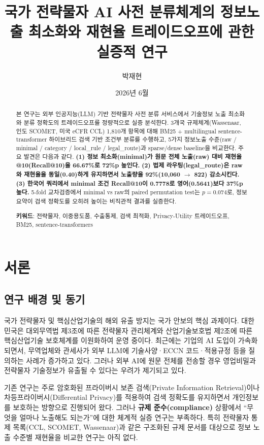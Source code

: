 \documentclass[11pt,a4paper]{article}
\title{\textbf{국가 전략물자 AI 사전 분류체계의 정보노출 최소화와 재현율 트레이드오프에 관한 실증적 연구}}
\author{박재현}
\date{2026년 6월}
\begin{document}
\maketitle

\begin{abstract}
본 연구는 외부 인공지능(LLM) 기반 전략물자 사전 분류 서비스에서 기술정보 노출 최소화와 분류 정확도의 트레이드오프를 정량적으로 실증 분석한다. 3개국 규제체계(Wassenaar, 인도 SCOMET, 미국 eCFR CCL) 1,810개 항목에 대해 BM25 + multilingual sentence-transformer 하이브리드 검색 기반 조건부 분류를 수행하고, 5가지 정보노출 수준(raw / minimal / category / local\_rule / legal\_route)과 sparse/dense baseline을 비교한다. 주요 발견은 다음과 같다. \textbf{(1) 정보 최소화(minimal)가 원문 전체 노출(raw) 대비 재현율@10(Recall@10)을 66.67\%로 72\%p 높인다.} \textbf{(2) 법제 라우팅(legal\_route)은 raw와 재현율을 동일(0.40)하게 유지하면서 노출량을 92\%(10,060 $\to$ 822) 감소시킨다.} \textbf{(3) 한국어 쿼리에서 minimal 조건 Recall@10이 0.7778로 영어(0.5641)보다 37\%p 높다.} 5-fold 교차검증에서 minimal vs raw의 paired permutation test는 $p=0.074$로, 정보 요약이 검색 정확도를 오히려 높이는 비직관적 결과를 실증한다.

\vspace{0.5cm}
\noindent\textbf{키워드}: 전략물자, 이중용도품, 수출통제, 검색 최적화, Privacy-Utility 트레이드오프, BM25, sentence-transformers
\end{abstract}

\section{서론}
\label{sec:intro}

\subsection{연구 배경 및 동기}
국가 전략물자 및 핵심산업기술의 해외 유출 방지는 국가 안보의 핵심 과제이다. 대한민국은 대외무역법 제3조에 따른 전략물자 관리체계와 산업기술보호법 제2조에 따른 핵심산업기술 보호체계를 이원화하여 운영 중이다. 최근에는 기업의 AI 도입이 가속화되면서, 무역업체와 관세사가 외부 LLM에 기술사양·ECCN 코드·적용규정 등을 질의하는 사례가 증가하고 있다. 그러나 외부 AI에 원문 전체를 전송할 경우 영업비밀과 전략물자 기술정보가 유출될 수 있다는 우려가 제기되고 있다.

기존 연구는 주로 암호화된 프라이버시 보존 검색(Private Information Retrieval)이나 차등프라이버시(Differential Privacy)를 적용하여 검색 정확도를 유지하면서 개인정보를 보호하는 방향으로 진행되어 왔다. 그러나 \textbf{규제 준수(compliance)} 상황에서 ``무엇을 얼마나 노출해도 되는가''에 대한 체계적 실증 연구는 부족하다. 특히 전략물자 통제 목록(CCL, SCOMET, Wassenaar)과 같은 구조화된 규제 문서를 대상으로 정보 노출 수준별 재현율을 비교한 연구는 아직 없다.
\end{document}
